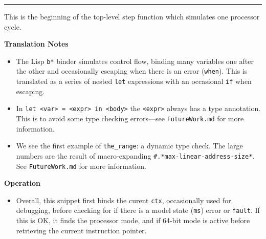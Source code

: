 \documentclass[a4paper]{article}
\begin{document}
\begin{tcolorbox}
\begin{parcolumns}{2}
\colplacechunks
\hrule

\colplacechunks
\end{parcolumns}


This is the beginning of the top-level step function which simulates one processor cycle.

\noindent
\textbf{Translation Notes}
\begin{itemize}
  \item The Lisp \texttt{b*} binder simulates control flow, binding many variables one after the other and occasionally escaping when there is an error (\texttt{when}).  This is translated as a series of nested \texttt{let} expressions with an occasional \texttt{if} when escaping.
  \item In \texttt{let <var> = <expr> in <body>} the \texttt{<expr>} always has a type annotation.  This is to avoid some type checking errors---see \texttt{FutureWork.md} for more information.
  \item We see the first example of \texttt{the\_range}: a dynamic type check.  The large numbers are the result of macro-expanding \texttt{\#.*max-linear-address-size*}.  See \texttt{FutureWork.md} for more information.
\end{itemize}

\noindent
\textbf{Operation}
\begin{itemize}
  \item Overall, this snippet first binds the curent \texttt{ctx}, occasionally used for debugging, before checking for if there is a model state (\texttt{ms}) error or \texttt{fault}.  If this is OK, it finds the processor mode, and if 64-bit mode is active before retrieving the current instruction pointer.
\end{itemize}
  
\end{tcolorbox}
\end{document}
